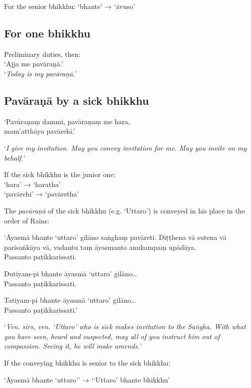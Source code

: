 For the senior bhikkhu: ‘bhante’ → ‘āvuso’ 

\subsection{For one bhikkhu}

Preliminary duties, then:\\
‘Ajja me pavāraṇā.’\\
‘\emph{Today is my pavāraṇā.}’ 

\subsection{Pavāraṇā by a sick bhikkhu}

‘Pavāraṇaṃ dammi, pavāraṇaṃ me hara,\\
mam'atthāya pavārehi.’

‘\emph{I give my invitation. May you convey invitation for me. May you invite on
  my behalf.}’


If the sick bhikkhu is the junior one:\\
‘hara’ → ‘haratha’\\
‘pavārehi’ → ‘pavāretha’

The \emph{pavāraṇā} of the sick bhikkhu (e.g. ‘Uttaro’) is conveyed in his place
in the order of Rains:

\vspace*{\parskip}

\begin{paritta}
‘Āyasmā bhante ‘uttaro’ gilāno saṅghaṃ pavāreti. Diṭṭhena vā sutena vā
parisaṅkāya vā, vadantu taṃ āyasmanto anukampaṃ upādāya.\\
Passanto paṭikkarissati.

Dutiyam-pi bhante āyasmā ‘uttaro’ gilāno…\\
Passanto paṭikkarissati.

Tatiyam-pi bhante āyasmā ‘uttaro’ gilāno…\\
Passanto paṭikkarissati.’
\end{paritta}

‘\emph{Ven. sirs, ven. ‘Uttaro’ who is sick makes invitation to the Saṅgha. With
  what you have seen, heard and suspected, may all of you instruct him out of
  compassion. Seeing it, he will make amends.}’

If the conveying bhikkhu is senior to the sick bhikkhu:

‘Āyasmā bhante ‘uttaro’’ → ‘‘Uttaro’ bhante bhikkhu’

